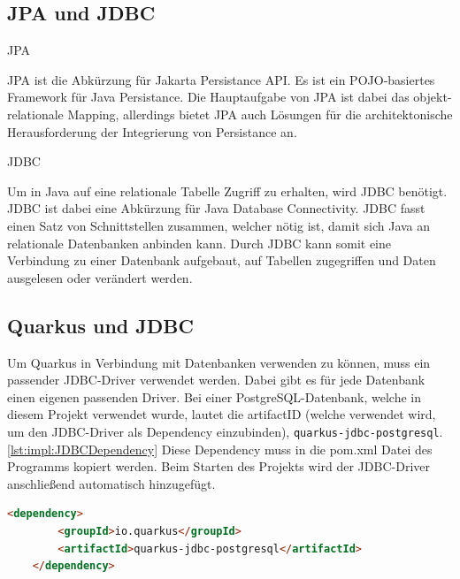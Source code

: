  
\subsection{JPA und JDBC}



\begin{compactitem}
    \item [JPA]
    \item JPA ist die Abkürzung für Jakarta Persistance API. Es ist ein POJO-basiertes Framework für Java Persistance. Die Hauptaufgabe von JPA ist dabei das objekt-relationale Mapping, allerdings bietet JPA auch Lösungen für die architektonische Herausforderung der Integrierung von Persistance an.
    \item [JDBC]
    \item Um in Java auf eine relationale Tabelle Zugriff zu erhalten, wird JDBC benötigt. JDBC ist dabei eine Abkürzung für Java Database Connectivity. JDBC fasst einen Satz von Schnittstellen zusammen, welcher nötig ist, damit sich Java an relationale Datenbanken anbinden kann. Durch JDBC kann somit eine Verbindung zu einer Datenbank aufgebaut, auf Tabellen zugegriffen und Daten ausgelesen oder verändert werden.  
\end{compactitem}
\cite{quarkusHibernate}

\subsection{Quarkus und JDBC}
Um Quarkus in Verbindung mit Datenbanken verwenden zu können, muss ein passender JDBC-Driver verwendet werden. Dabei gibt es für jede Datenbank einen eigenen passenden Driver. Bei einer PostgreSQL-Datenbank, welche in diesem Projekt verwendet wurde, lautet die artifactID (welche verwendet wird, um den JDBC-Driver als Dependency einzubinden), \texttt{quarkus-jdbc-postgresql}. \ref{lst:impl:JDBCDependency} Diese Dependency muss in die pom.xml Datei des Programms kopiert werden. Beim Starten des Projekts wird der JDBC-Driver anschließend automatisch hinzugefügt. \cite{quarkusHibernate}


\begin{lstlisting}[language=html,caption=JDBC Dependency,label=lst:impl:JDBCDependency]
    <dependency>
        <groupId>io.quarkus</groupId>
        <artifactId>quarkus-jdbc-postgresql</artifactId>
    </dependency>
  \end{lstlisting}

